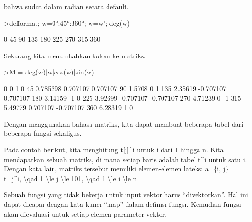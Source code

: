\documentclass[a4paper,10pt]{article}
\begin{document}
\begin{eulernotebook}
\begin{eulercomment}
\begin{eulercomment}
\begin{eulercomment}
\begin{eulercomment}
\begin{eulercomment}
bahwa sudut dalam radian secara default.
\end{eulercomment}
\begin{eulerprompt}
>defformat; w=0°:45°:360°; w=w'; deg(w)
\end{eulerprompt}
\begin{euleroutput}
              0 
             45 
             90 
            135 
            180 
            225 
            270 
            315 
            360 
\end{euleroutput}
\begin{eulercomment}
Sekarang kita menambahkan kolom ke matriks.
\end{eulercomment}
\begin{eulerprompt}
>M = deg(w)|w|cos(w)|sin(w)
\end{eulerprompt}
\begin{euleroutput}
              0             0             1             0 
             45      0.785398      0.707107      0.707107 
             90        1.5708             0             1 
            135       2.35619     -0.707107      0.707107 
            180       3.14159            -1             0 
            225       3.92699     -0.707107     -0.707107 
            270       4.71239             0            -1 
            315       5.49779      0.707107     -0.707107 
            360       6.28319             1             0 
\end{euleroutput}
\begin{eulercomment}
Dengan menggunakan bahasa matriks, kita dapat membuat beberapa tabel
dari beberapa fungsi sekaligus.


Pada contoh berikut, kita menghitung t[j]\textasciicircum{}i untuk i dari 1 hingga n.
Kita mendapatkan sebuah matriks, di mana setiap baris adalah tabel t\textasciicircum{}i
untuk satu i. Dengan kata lain, matriks tersebut memiliki
elemen-elemen lateks: a\_\{i, j\} = t\_j\textasciicircum{}i, \textbackslash{}qad 1 \textbackslash{}le j \textbackslash{}le 101, \textbackslash{}qad 1
\textbackslash{}le i \textbackslash{}le n


Sebuah fungsi yang tidak bekerja untuk input vektor harus
“divektorkan”. Hal ini dapat dicapai dengan kata kunci “map” dalam
definisi fungsi. Kemudian fungsi akan dievaluasi untuk setiap elemen
parameter vektor.


\end{eulercomment}
\end{eulercomment}
\end{eulercomment}
\end{eulercomment}
\end{eulercomment}
\end{eulernotebook}
\end{document}
